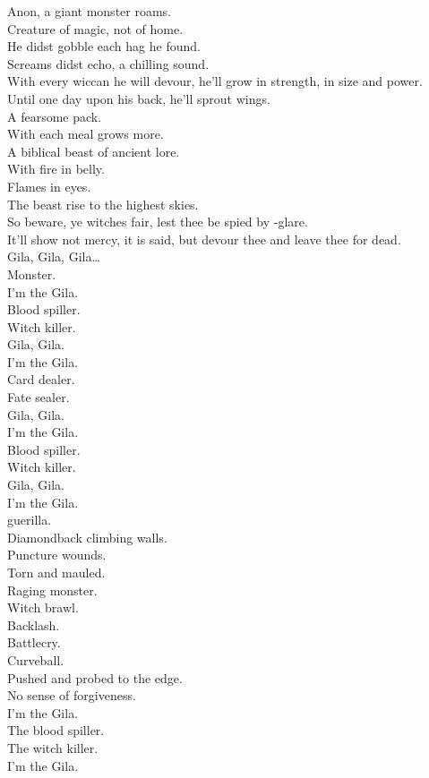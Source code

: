 

Anon, a giant monster roams. \\
Creature of magic, not of home. \\
He didst gobble each hag he found. \\
Screams didst echo, a chilling sound. \\
With every wiccan he will devour, he'll grow in strength, in size and power. \\
Until one day upon his back, he'll sprout wings. \\
A fearsome pack. \\
With each meal  grows more. \\
A biblical beast of ancient lore. \\
With fire in belly. \\
Flames in eyes. \\
The beast rise to the highest skies. \\
So beware, ye witches fair, lest thee be spied by -glare. \\
It'll show not mercy, it is said, but devour thee and leave thee for dead. \\

Gila, Gila, Gila… \\
Monster. \\

I'm the Gila. \\
Blood spiller. \\
Witch killer. \\
Gila, Gila. \\
I'm the Gila. \\
Card dealer. \\
Fate sealer. \\
Gila, Gila. \\
I'm the Gila. \\
Blood spiller. \\
Witch killer. \\
Gila, Gila. \\
I'm the Gila. \\
 guerilla. \\

Diamondback climbing walls. \\
Puncture wounds. \\
Torn and mauled. \\
Raging monster. \\
Witch brawl. \\
Backlash. \\
Battlecry. \\
Curveball. \\
Pushed and probed to the edge. \\
No sense of forgiveness. \\
I'm the Gila. \\
The blood spiller. \\
The witch killer. \\
I'm the Gila. \\

